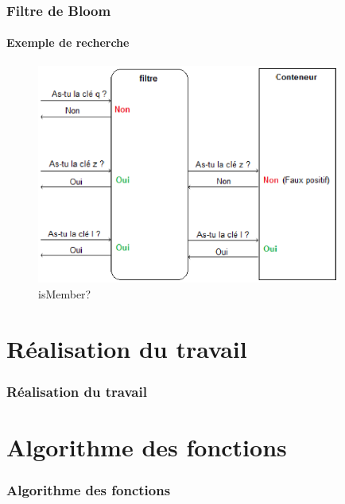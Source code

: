 \documentclass[hyperref={pdfpagemode=FullScreen,colorlinks=true},xcolor=pst,dvips]{beamer}\usepackage[french]{babel}
\begin{document}
	\begin{frame}[shrink]
		\frametitle{Filtre de Bloom}
		\framesubtitle{Exemple de recherche}
		\begin{figure}[!htbp]
	\centering
	\includegraphics[width=10cm]{ismember.eps}
	\caption{isMember?}
\end{figure}	

	\end{frame}
	
	\section{Réalisation du travail}
	\begin{frame}
		\frametitle{Réalisation du travail}	
	\end{frame}
	
	\section{Algorithme des fonctions}
	\begin{frame}
		\frametitle{Algorithme des fonctions}
	\end{frame}
	
\end{document}

